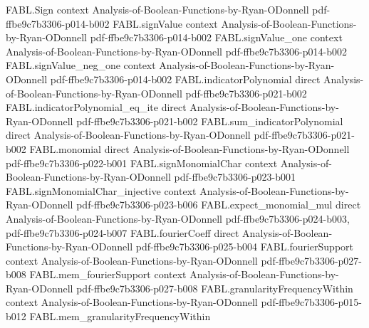 \begin{theorem}
\label{FABL.noiseStability_toReal_eq_spectralSample_moment}
\leanok
{}
\proofstep
  {FABL.Sign}
  {context}
  {Analysis-of-Boolean-Functions-by-Ryan-ODonnell}
  {pdf-ffbe9c7b3306-p014-b002}
\proofstep
  {FABL.signValue}
  {context}
  {Analysis-of-Boolean-Functions-by-Ryan-ODonnell}
  {pdf-ffbe9c7b3306-p014-b002}
\proofstep
  {FABL.signValue_one}
  {context}
  {Analysis-of-Boolean-Functions-by-Ryan-ODonnell}
  {pdf-ffbe9c7b3306-p014-b002}
\proofstep
  {FABL.signValue_neg_one}
  {context}
  {Analysis-of-Boolean-Functions-by-Ryan-ODonnell}
  {pdf-ffbe9c7b3306-p014-b002}
\proofstep
  {FABL.indicatorPolynomial}
  {direct}
  {Analysis-of-Boolean-Functions-by-Ryan-ODonnell}
  {pdf-ffbe9c7b3306-p021-b002}
\proofstep
  {FABL.indicatorPolynomial_eq_ite}
  {direct}
  {Analysis-of-Boolean-Functions-by-Ryan-ODonnell}
  {pdf-ffbe9c7b3306-p021-b002}
\proofstep
  {FABL.sum_indicatorPolynomial}
  {direct}
  {Analysis-of-Boolean-Functions-by-Ryan-ODonnell}
  {pdf-ffbe9c7b3306-p021-b002}
\proofstep
  {FABL.monomial}
  {direct}
  {Analysis-of-Boolean-Functions-by-Ryan-ODonnell}
  {pdf-ffbe9c7b3306-p022-b001}
\proofstep
  {FABL.signMonomialChar}
  {context}
  {Analysis-of-Boolean-Functions-by-Ryan-ODonnell}
  {pdf-ffbe9c7b3306-p023-b001}
\proofstep
  {FABL.signMonomialChar_injective}
  {context}
  {Analysis-of-Boolean-Functions-by-Ryan-ODonnell}
  {pdf-ffbe9c7b3306-p023-b006}
\proofstep
  {FABL.expect_monomial_mul}
  {direct}
  {Analysis-of-Boolean-Functions-by-Ryan-ODonnell}
  {pdf-ffbe9c7b3306-p024-b003,
    pdf-ffbe9c7b3306-p024-b007}
\proofstep
  {FABL.fourierCoeff}
  {direct}
  {Analysis-of-Boolean-Functions-by-Ryan-ODonnell}
  {pdf-ffbe9c7b3306-p025-b004}
\proofstep
  {FABL.fourierSupport}
  {context}
  {Analysis-of-Boolean-Functions-by-Ryan-ODonnell}
  {pdf-ffbe9c7b3306-p027-b008}
\proofstep
  {FABL.mem_fourierSupport}
  {context}
  {Analysis-of-Boolean-Functions-by-Ryan-ODonnell}
  {pdf-ffbe9c7b3306-p027-b008}
\proofstep
  {FABL.granularityFrequencyWithin}
  {context}
  {Analysis-of-Boolean-Functions-by-Ryan-ODonnell}
  {pdf-ffbe9c7b3306-p015-b012}
\proofstep
  {FABL.mem_granularityFrequencyWithin}

\end{theorem}
